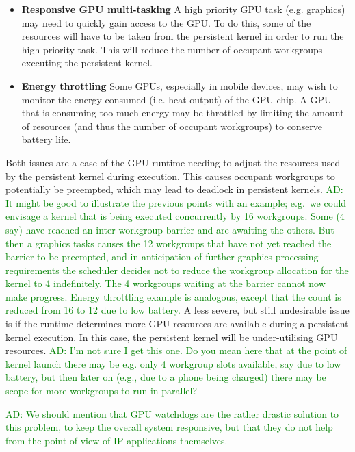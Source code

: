 \documentclass[nocopyrightspace]{sigplanconf-pldi16}
\newcommand{\ADComment}[1]{\textcolor{green}{AD: #1}}
\begin{document}
\begin{itemize}
\item {\bf Responsive GPU multi-tasking} A high priority GPU task
  (e.g. graphics) may need to quickly gain access to the GPU. To do
  this, some of the resources will have to be taken from the
  persistent kernel in order to run the high priority task. This will
  reduce the number of occupant workgroups executing the persistent
  kernel.

\item {\bf Energy throttling} Some GPUs, especially in mobile devices,
  may wish to monitor the energy consumed (i.e. heat output) of the
  GPU chip.  A GPU that is consuming too much energy may be throttled
  by limiting the amount of resources (and thus the number of occupant
  workgroups) to conserve battery life.
\end{itemize}

Both issues are a case of the GPU runtime needing to adjust the
resources used by the persistent kernel during execution. This causes
occupant workgroups to potentially be preempted, which may lead to
deadlock in persistent kernels. \ADComment{It might be good to illustrate the previous points with an example; e.g.\ we could envisage a kernel that is being executed concurrently by 16 workgroups.  Some (4 say) have reached an inter workgroup barrier and are awaiting the others.  But then a graphics tasks causes the 12 workgroups that have not yet reached the barrier to be preempted, and in anticipation of further graphics processing requirements the scheduler decides not to reduce the workgroup allocation for the kernel to 4 indefinitely.  The 4 workgroups waiting at the barrier cannot now make progress.  Energy throttling example is analogous, except that the count is reduced from 16 to 12 due to low battery.}
A less severe, but still undesirable
issue is if the runtime determines more GPU resources are available
during a persistent kernel execution. In this case, the persistent
kernel will be under-utilising GPU resources. \ADComment{I'm not sure I get this one.  Do you mean here that at the point of kernel launch there may be e.g. only 4 workgroup slots available, say due to low battery, but then later on (e.g., due to a phone being charged) there may be scope for more workgroups to run in parallel?}

\ADComment{We should mention that GPU watchdogs are the rather drastic solution to this problem, to keep the overall system responsive, but that they do not help from the point of view of IP applications themselves.}
\end{document}
